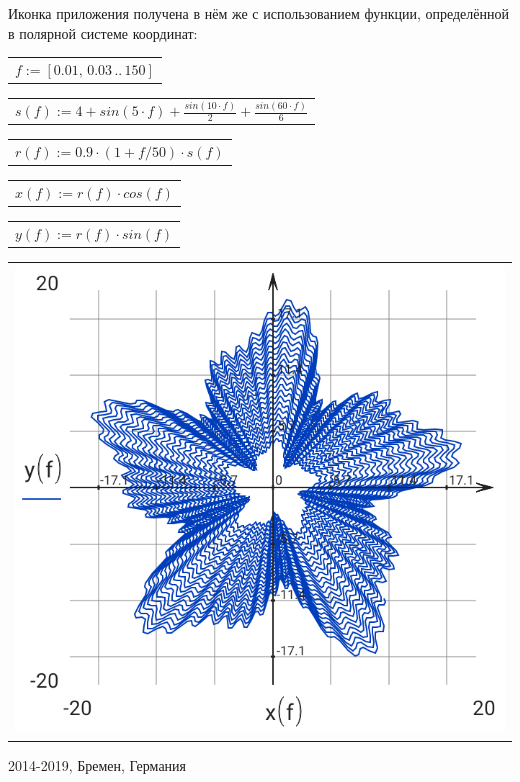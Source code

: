 \documentclass[DIV=calc, paper=a4, fontsize=11pt, twocolumn]{scrartcl}
\begin{document}
Иконка приложения получена в нём же
с использованием функции,
определённой в полярной системе
координат:
\begin{center}\begin{tabular}{c}
  $f := \left[ 0.01,\, 0.03 \,..\, 150 \right]$
\end{tabular}\end{center}
\begin{center}\begin{tabular}{c}
  $s(f) := 4 + sin \left( 5 \cdot f\right)  + \frac{sin \left( 10 \cdot f\right) }{2} + \frac{sin \left( 60 \cdot f\right) }{6}$
\end{tabular}\end{center}
\begin{center}\begin{tabular}{c}
  $r(f) := 0.9 \cdot \left( 1 + f / 50 \right) \cdot s \left( f\right) $
\end{tabular}\end{center}
\begin{center}\begin{tabular}{c}
  $x(f) := r \left( f\right)  \cdot cos \left( f\right) $
\end{tabular}\end{center}
\begin{center}\begin{tabular}{c}
  $y(f) := r \left( f\right)  \cdot sin \left( f\right) $
\end{tabular}\end{center}
\begin{center}\begin{tabular}{c} \includegraphics[resolution=320]{graphics/about_micromath_fig1.png} \end{tabular}\end{center}

2014-2019, Бремен, Германия
\end{document}
